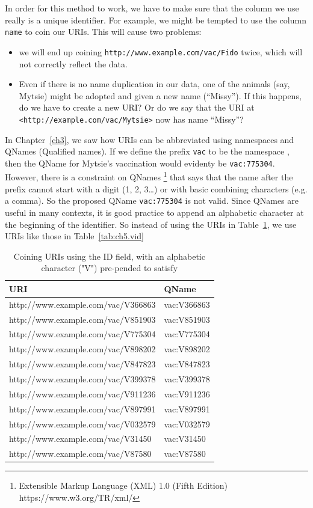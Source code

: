 In order for this method to work, we have to make sure that the column we use really is a unique  identifier. 
For example, we might be tempted to use the column \texttt{name} to coin our URIs.  
This will cause two problems: 

\begin{itemize}
    \item we will end up coining 
\texttt{http://www.example.com/vac/Fido} twice, which will not correctly reflect the data. 
\item Even if there is no  name duplication in our data, one of the animals (say, Mytsie) might be adopted and given a new name (``Missy'').  If this happens, do we have to create a new URI?   Or do we say that the URI at \texttt{<http://example.com/vac/Mytsie>} now has name ``Missy''?
\end{itemize}

In Chapter~\ref{ch3}, we saw how URIs can be abbreviated using namespaces and QNames (Qualified names). 
If we define the prefix \texttt{vac} to be the namespace
, then the QName for Mytsie's vaccination would evidenty be
\texttt{vac:775304}.   However, there is a constraint on QNames \footnote{Extensible Markup Language
 (XML) 1.0 (Fifth Edition) https://www.w3.org/TR/xml/} that says that the name after the 
 prefix cannot start with a digit (1, 2,
3\ldots{}) or with basic combining characters (e.g. a comma).  So the proposed QName \texttt{vac:775304} is not valid.  Since QNames are useful in many contexts, it is good practice to append an alphabetic character at the beginning of the identifier.  So instead of using the URIs in Table~\ref{tab:ch5.id}, we use URIs like those in Table~\ref{tab:ch5.vid}

\begin{table}
    \centering
    \begin{tabular}{|l l|}
    \hline
    URI&QName \\
    \hline\hline
http://www.example.com/vac/V366863&vac:V366863 \\
http://www.example.com/vac/V851903&vac:V851903 \\
http://www.example.com/vac/V775304&vac:V775304 \\
http://www.example.com/vac/V898202&vac:V898202 \\
http://www.example.com/vac/V847823&vac:V847823 \\
http://www.example.com/vac/V399378&vac:V399378 \\
http://www.example.com/vac/V911236&vac:V911236 \\
http://www.example.com/vac/V897991&vac:V897991 \\
http://www.example.com/vac/V032579&vac:V032579 \\
http://www.example.com/vac/V31450&vac:V31450 \\
http://www.example.com/vac/V87580&vac:V87580 \\
\hline
    \end{tabular}
    \caption{Coining URIs using the ID field, with an alphabetic character ("V") pre-pended to satisfy  }
    \label{tab:ch5.id}
\end{table}

